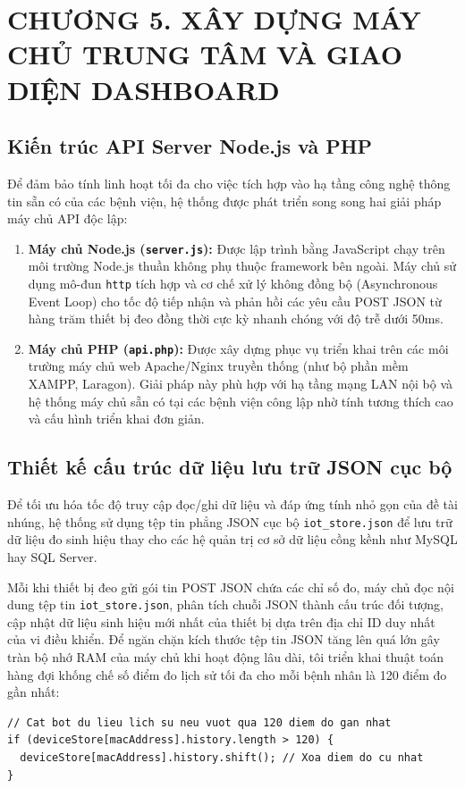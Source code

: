 \section*{CHƯƠNG 5. XÂY DỰNG MÁY CHỦ TRUNG TÂM VÀ GIAO DIỆN DASHBOARD}
\setcounter{section}{5}
\setcounter{subsection}{0}
\setcounter{figure}{0}
\setcounter{table}{0}

\subsection{Kiến trúc API Server Node.js và PHP}
Để đảm bảo tính linh hoạt tối đa cho việc tích hợp vào hạ tầng công nghệ thông tin sẵn có của các bệnh viện, hệ thống được phát triển song song hai giải pháp máy chủ API độc lập:
\begin{enumerate}
    \item \textbf{Máy chủ Node.js (\texttt{server.js}):} Được lập trình bằng JavaScript chạy trên môi trường Node.js thuần không phụ thuộc framework bên ngoài. Máy chủ sử dụng mô-đun \texttt{http} tích hợp và cơ chế xử lý không đồng bộ (Asynchronous Event Loop) cho tốc độ tiếp nhận và phản hồi các yêu cầu POST JSON từ hàng trăm thiết bị đeo đồng thời cực kỳ nhanh chóng với độ trễ dưới 50ms.
    \item \textbf{Máy chủ PHP (\texttt{api.php}):} Được xây dựng phục vụ triển khai trên các môi trường máy chủ web Apache/Nginx truyền thống (như bộ phần mềm XAMPP, Laragon). Giải pháp này phù hợp với hạ tầng mạng LAN nội bộ và hệ thống máy chủ sẵn có tại các bệnh viện công lập nhờ tính tương thích cao và cấu hình triển khai đơn giản.
\end{enumerate}

\subsection{Thiết kế cấu trúc dữ liệu lưu trữ JSON cục bộ}
Để tối ưu hóa tốc độ truy cập đọc/ghi dữ liệu và đáp ứng tính nhỏ gọn của đề tài nhúng, hệ thống sử dụng tệp tin phẳng JSON cục bộ \texttt{iot\_store.json} để lưu trữ dữ liệu đo sinh hiệu thay cho các hệ quản trị cơ sở dữ liệu cồng kềnh như MySQL hay SQL Server.

Mỗi khi thiết bị đeo gửi gói tin POST JSON chứa các chỉ số đo, máy chủ đọc nội dung tệp tin \texttt{iot\_store.json}, phân tích chuỗi JSON thành cấu trúc đối tượng, cập nhật dữ liệu sinh hiệu mới nhất của thiết bị dựa trên địa chỉ ID duy nhất của vi điều khiển. Để ngăn chặn kích thước tệp tin JSON tăng lên quá lớn gây tràn bộ nhớ RAM của máy chủ khi hoạt động lâu dài, tôi triển khai thuật toán hàng đợi khống chế số điểm đo lịch sử tối đa cho mỗi bệnh nhân là 120 điểm đo gần nhất:
\begin{lstlisting}
// Cat bot du lieu lich su neu vuot qua 120 diem do gan nhat
if (deviceStore[macAddress].history.length > 120) {
  deviceStore[macAddress].history.shift(); // Xoa diem do cu nhat
}
\end{lstlisting}

